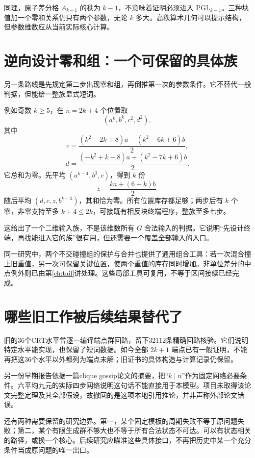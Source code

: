 同理，原子差分格 $A_{k-1}$ 的秩为 $k-1$，不意味着证明必须进入 $\mathrm{PGL}_{k-1}$。三种块值加一个零和关系仍只有两个参数，无论 $k$ 多大。高秩算术几何可以提示结构，但参数维数应从当前实际核心计算。

\section{逆向设计零和组：一个可保留的具体族}
另一条路线是先规定第二步出现零和组，再倒推第一次的参数条件。它不替代一般判据，但能给一整族显式短词。

例如奇数 $k\ge5$，在 $n=2k+4$ 个位置取
\[(a^k,b^k,c^2,d^2),
\]
其中
\[
c=\frac{(k^2-2k+8)a-(k^2-6k+6)b}{2},
\]
\[
d=\frac{(-k^2+k-8)a+(k^2-7k+6)b}{2}.
\]
它总和为零。先平均 $(a^{k-4},b^3,c)$，得到 $k$ 份
\[z=\frac{ka+(6-k)b}{2}.
\]
随后平均 $(d,c,z,b^{k-3})$，其和恰为零。所有位置库存都足够；两步后有 $k$ 个零，非零支持至多 $k+4\le2k$，可接既有相反块终端程序，整族至多七步。

这给出了一个二维输入族，不是该维数所有 $G$ 合法输入的判据。它说明“先设计终端，再找能进入它的族”很有用，但还需要一个覆盖全部输入的入口。

同一研究中，两个不交碰撞组的保护与合并也提供了通用组合工具：若一次混合撞上旧重值，另一次可保留关键位置，使两个重值的库存同时增加。非单位差分的中点例外则已由第\ref{ch:tail}讲处理。这些局部工具可复用，不等于区间接续已经完成。

\section{哪些旧工作被后续结果替代了}
旧的36个CRT水平曾逐一编译端点群回路，留下32112条精确回路核验。它们说明特定水平能实现，也保留了短词数据。如今全部 $2k+1$ 端点已有一般证明，不能再把这36个水平以外都列为端点未解；旧证书的具体构造与计算记录仍保留。

另一份早期报告依据一篇clique gossip论文的摘要，把“$k\mid n$”作为固定网络必要条件。六平均九元的实际四步网络说明这句话不能直接用于本模型。项目未取得该论文完整定理及其全部假设，故撤回的是这项本地引用推论，并非声称外部论文错误。

还有两种需要保留的研究边界。第一，某个固定模板的周期失败不等于原问题失败；第二，某个有限生成群不够大也不等于所有合法状态不可达。可以有状态相关的路径，或换一个核心。后续研究应瞄准这些具体接口，不再把历史中某一个充分条件当成原问题的唯一出口。
